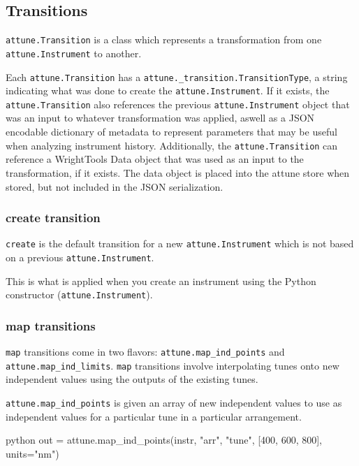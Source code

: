 \hypertarget{transitions}{%
\subsection{Transitions}\label{transitions}}

\texttt{attune.Transition} is a class which represents
a transformation from one \texttt{attune.Instrument} to
another.

Each \texttt{attune.Transition} has a
\texttt{attune.\_transition.TransitionType}, a string
indicating what was done to create the
\texttt{attune.Instrument}. If it exists, the
\texttt{attune.Transition} also references the previous
\texttt{attune.Instrument} object that was an input to
whatever transformation was applied, aswell as a JSON encodable
dictionary of metadata to represent parameters that may be useful when
analyzing instrument history. Additionally, the
\texttt{attune.Transition} can reference a WrightTools
Data object that was used as an input to the transformation, if it
exists. The data object is placed into the attune store when stored, but
not included in the JSON serialization.

\hypertarget{create-transition}{%
\subsubsection{create transition}\label{create-transition}}

\texttt{create} is the default transition for a new
\texttt{attune.Instrument} which is not based on a
previous \texttt{attune.Instrument}.

This is what is applied when you create an instrument using the Python
constructor (\texttt{attune.Instrument}).

\hypertarget{map-transitions}{%
\subsubsection{map transitions}\label{map-transitions}}

\texttt{map} transitions come in two flavors:
\texttt{attune.map\_ind\_points} and \texttt{attune.map\_ind\_limits}.
\texttt{map} transitions involve interpolating tunes onto new
independent values using the outputs of the existing tunes.

\texttt{attune.map\_ind\_points} is given an array of new independent
values to use as independent values for a particular tune in a
particular arrangement.

\begin{codefragment}{python}
out = attune.map_ind_points(instr, "arr", "tune", [400, 600, 800], units="nm")
\end{codefragment}

